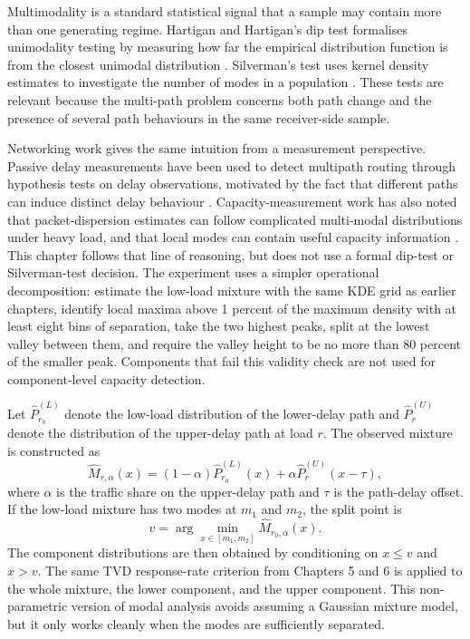 \documentclass[a4paper,11pt]{report}
\begin{document}
Multimodality is a standard statistical signal that a sample may contain more than one generating regime. Hartigan and Hartigan's dip test formalises unimodality testing by measuring how far the empirical distribution function is from the closest unimodal distribution \cite{hartiganDip}. Silverman's test uses kernel density estimates to investigate the number of modes in a population \cite{silvermanModes}. These tests are relevant because the multi-path problem concerns both path change and the presence of several path behaviours in the same receiver-side sample.

Networking work gives the same intuition from a measurement perspective. Passive delay measurements have been used to detect multipath routing through hypothesis tests on delay observations, motivated by the fact that different paths can induce distinct delay behaviour \cite{panMultipathDelay}. Capacity-measurement work has also noted that packet-dispersion estimates can follow complicated multi-modal distributions under heavy load, and that local modes can contain useful capacity information \cite{linLmsa}. This chapter follows that line of reasoning, but does not use a formal dip-test or Silverman-test decision. The experiment uses a simpler operational decomposition: estimate the low-load mixture with the same KDE grid as earlier chapters, identify local maxima above 1 percent of the maximum density with at least eight bins of separation, take the two highest peaks, split at the lowest valley between them, and require the valley height to be no more than 80 percent of the smaller peak. Components that fail this validity check are not used for component-level capacity detection.

Let \(\widehat{P}_{r_0}^{(L)}\) denote the low-load distribution of the lower-delay path and \(\widehat{P}_{r}^{(U)}\) denote the distribution of the upper-delay path at load \(r\). The observed mixture is constructed as
\[
\widehat{M}_{r,\alpha}(x)
= (1-\alpha)\widehat{P}_{r_0}^{(L)}(x)
+ \alpha \widehat{P}_{r}^{(U)}(x-\tau),
\]
where \(\alpha\) is the traffic share on the upper-delay path and \(\tau\) is the path-delay offset. If the low-load mixture has two modes at \(m_1\) and \(m_2\), the split point is
\[
v = \arg\min_{x \in [m_1,m_2]}\widehat{M}_{r_0,\alpha}(x).
\]
The component distributions are then obtained by conditioning on \(x \leq v\) and \(x>v\). The same TVD response-rate criterion from Chapters 5 and 6 is applied to the whole mixture, the lower component, and the upper component. This non-parametric version of modal analysis avoids assuming a Gaussian mixture model, but it only works cleanly when the modes are sufficiently separated.
\end{document}
